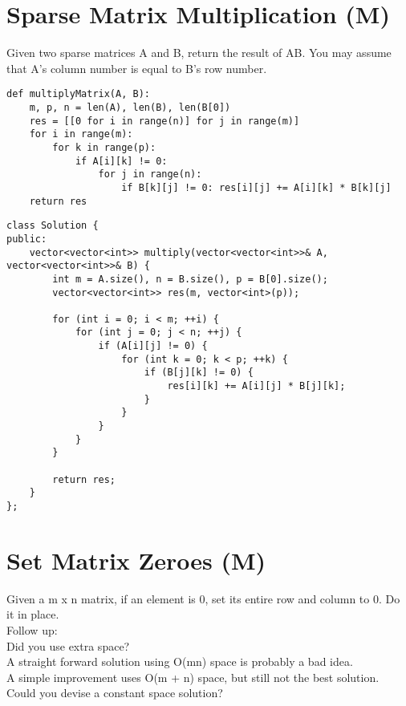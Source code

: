 \section{Sparse Matrix Multiplication (M)}
Given two sparse matrices A and B, return the result of AB. You may assume that A's column number is equal to B's row number.\\

\begin{lstlisting}
def multiplyMatrix(A, B):
	m, p, n = len(A), len(B), len(B[0])
	res = [[0 for i in range(n)] for j in range(m)]
	for i in range(m):
		for k in range(p):
			if A[i][k] != 0:
				for j in range(n):
					if B[k][j] != 0: res[i][j] += A[i][k] * B[k][j]
	return res	
\end{lstlisting}

\begin{lstlisting}
class Solution {
public:
    vector<vector<int>> multiply(vector<vector<int>>& A, vector<vector<int>>& B) {
        int m = A.size(), n = B.size(), p = B[0].size();
        vector<vector<int>> res(m, vector<int>(p));
        
        for (int i = 0; i < m; ++i) {
            for (int j = 0; j < n; ++j) {
                if (A[i][j] != 0) {
                    for (int k = 0; k < p; ++k) {
                        if (B[j][k] != 0) {
                            res[i][k] += A[i][j] * B[j][k]; 
                        }
                    }
                }
            }
        }
        
        return res;
    }
};
\end{lstlisting}


\section{Set Matrix Zeroes (M)}
Given a m x n matrix, if an element is 0, set its entire row and column to 0. Do it in place.\\

Follow up:\\
Did you use extra space?\\
A straight forward solution using O(mn) space is probably a bad idea.\\
A simple improvement uses O(m + n) space, but still not the best solution.\\
Could you devise a constant space solution?\\

